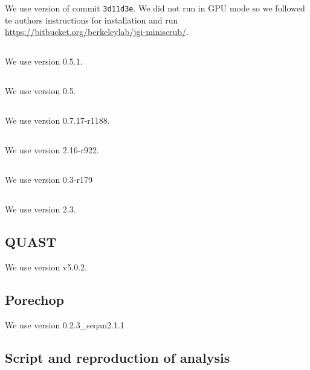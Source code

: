 \documentclass[../../main.tex]{subfiles}
\begin{document}
We use version of commit \texttt{3d11d3e}. We did not run \miniscrub in GPU mode so we followed te  authors instructions for installation and run \url{https://bitbucket.org/berkeleylab/jgi-miniscrub/}.

\subsection{\yacrd}

We use version 0.5.1.

\subsection{\fpa}

We use version 0.5.

\subsection{\bwa}

We use version 0.7.17-r1188.

\subsection{\minimap}

We use version 2.16-r922.

\subsection{\miniasm}

We use version 0.3-r179

\subsection{\wtdbg}

We use version 2.3.

\subsection{QUAST}

We use version v5.0.2.

\subsection{Porechop}

We use version 0.2.3\_seqan2.1.1

\subsection{Script and reproduction of analysis}\label{sub:repro-everything}
\end{document}
